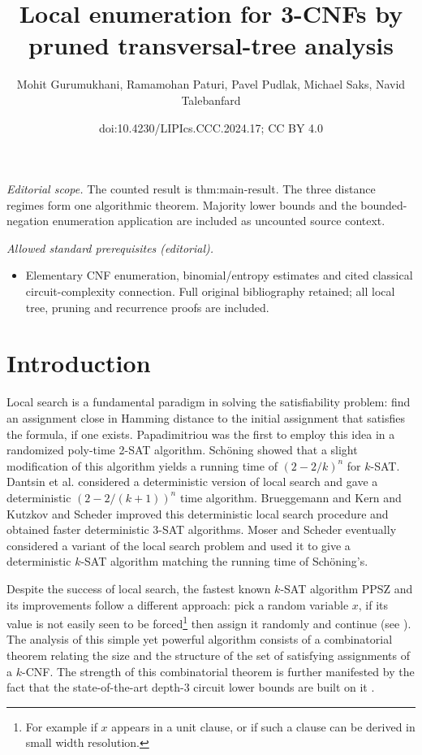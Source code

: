\documentclass[10pt,a4paper]{article}
\title{Local enumeration for 3-CNFs by pruned transversal-tree analysis}
\author{Mohit Gurumukhani, Ramamohan Paturi, Pavel Pudlak, Michael Saks, Navid Talebanfard}
\date{doi:10.4230/LIPIcs.CCC.2024.17; CC BY 4.0}
\begin{document}
\maketitle
\noindent\textit{Editorial scope.} The counted result is thm:main-result. The three distance regimes form one algorithmic theorem. Majority lower bounds and the bounded-negation enumeration application are included as uncounted source context.\par\medskip
\noindent\textit{Allowed standard prerequisites (editorial).}\begin{itemize}
\item Elementary CNF enumeration, binomial/entropy estimates and cited classical circuit-complexity connection. Full original bibliography retained; all local tree, pruning and recurrence proofs are included.
\end{itemize}\medskip
\section{Introduction} \label{sec:introduction}

Local search is a fundamental paradigm in solving the satisfiability problem: find an assignment close in Hamming distance to the initial assignment that satisfies the formula, if one exists. Papadimitriou \cite{Papadimitriou91} was the first to employ this idea in a randomized poly-time 2-SAT algorithm. Sch{\" o}ning \cite{DSchoning02} showed that a slight modification of this algorithm yields a running time of $(2 - 2/k)^n$ for $k$-SAT. Dantsin et al. \cite{DantsinGHKKPRS02} considered a deterministic version of local search and gave a deterministic $(2 - 2/(k+1))^n$ time algorithm. Brueggemann and Kern \cite{BrueggemannK04} and Kutzkov and Scheder \cite{KS} improved this deterministic local search procedure and obtained faster deterministic 3-SAT algorithms. Moser and Scheder \cite{MoserS11} eventually considered a variant of the local search problem and used it to give a deterministic $k$-SAT algorithm matching the running time of Sch{\" o}ning's.

Despite the success of local search, the fastest known $k$-SAT algorithm PPSZ and its improvements follow a different approach: pick a random variable $x$, if its value is not easily seen to be forced\footnote{For example if $x$ appears in a unit clause, or if such a clause can be derived in small width resolution.} then assign it randomly and continue (see \cite{PaturiPZ99,PaturiPSZ05,Hertli14,DBLP:conf/stoc/HansenKZZ19,Scheder21}). The analysis of this simple yet powerful algorithm consists of a combinatorial theorem relating the size and the structure of the set of satisfying assignments of a $k$-CNF. The strength of this combinatorial theorem is further manifested by the fact that the state-of-the-art depth-3 circuit lower bounds are built on it \cite{PaturiPZ99,PaturiPSZ05}.
\end{document}
